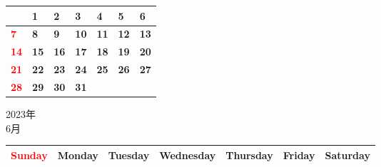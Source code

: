 \documentclass[a4paper,landscape]{jsarticle}
\newcommand{\dig}{\hspace{29mm}}
\newcommand{\tdig}{\hspace{27mm}}
\newcommand{\LBF}{\LARGE\textbf}
\begin{document}
\begingroup
\renewcommand{\arraystretch}{4}
\begin{tabular}{|p{32mm}|p{32mm}|p{32mm}|p{32mm}|p{32mm}|p{32mm}|p{32mm}|}
\hline
&\raisebox{30pt} {\dig\LBF{1}}&\raisebox{30pt} {\dig\LBF{2}}&\raisebox{30pt} {\dig\LBF{3}}&\raisebox{30pt} {\dig\LBF{4}}&\raisebox{30pt} {\dig\LBF{5}}&\raisebox{30pt} {\dig\LBF{6}}\\
\hline
\raisebox{30pt} {\dig\textcolor{red}{\LBF{7}}}&\raisebox{30pt} {\dig\LBF{8}}&\raisebox{30pt} {\dig\LBF{9}}&\raisebox{30pt} {\tdig\LBF{10}}&\raisebox{30pt} {\tdig\LBF{11}}&\raisebox{30pt} {\tdig\LBF{12}}&\raisebox{30pt} {\tdig\LBF{13}}\\
\hline
\raisebox{30pt} {\tdig\textcolor{red}{\LBF{14}}}&\raisebox{30pt} {\tdig\LBF{15}}&\raisebox{30pt} {\tdig\LBF{16}}&\raisebox{30pt} {\tdig\LBF{17}}&\raisebox{30pt} {\tdig\LBF{18}}&\raisebox{30pt} {\tdig\LBF{19}}&\raisebox{30pt} {\tdig\LBF{20}}\\
\hline
\raisebox{30pt} {\tdig\textcolor{red}{\LBF{21}}}&\raisebox{30pt} {\tdig\LBF{22}}&\raisebox{30pt} {\tdig\LBF{23}}&\raisebox{30pt} {\tdig\LBF{24}}&\raisebox{30pt} {\tdig\LBF{25}}&\raisebox{30pt} {\tdig\LBF{26}}&\raisebox{30pt} {\tdig\LBF{27}}\\
\hline
\raisebox{30pt} {\tdig\textcolor{red}{\LBF{28}}}&\raisebox{30pt} {\tdig\LBF{29}}&\raisebox{30pt} {\tdig\LBF{30}}&\raisebox{30pt} {\tdig\LBF{31}}&&&\\
\hline
\end{tabular}
\endgroup

\newpage

\begin{center}
	\LARGE 2023年\\
	\LARGE 6月
\end{center}

\begingroup
\renewcommand{\arraystretch}{1.4}
\begin{tabular}{|>{\centering\arraybackslash}p{32mm}|>{\centering\arraybackslash}p{32mm}|>{\centering\arraybackslash}p{32mm}|>{\centering\arraybackslash}p{32mm}|>{\centering\arraybackslash}p{32mm}|>{\centering\arraybackslash}p{32mm}|>{\centering\arraybackslash}p{32mm}|}
\hline
\textcolor{red}{\large Sunday}&\large Monday&\large Tuesday&\large Wednesday&\large Thursday&\large Friday&\large Saturday\\
\hline
\end{tabular}
\endgroup
\end{document}
